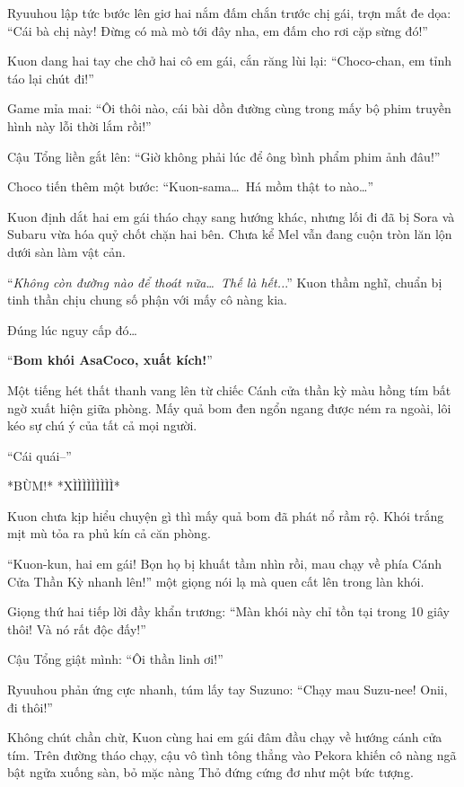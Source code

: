 \documentclass[../main.tex]{subfiles}
\begin{document}
Ryuuhou lập tức bước lên giơ hai nắm đấm chắn trước chị gái, trợn mắt đe dọa: ``Cái bà chị này! Đừng có mà mò tới đây nha, em đấm cho rơi cặp sừng đó!''

Kuon dang hai tay che chở hai cô em gái, cắn răng lùi lại: ``Choco-chan, em tỉnh táo lại chút đi!''

Game mỉa mai: ``Ôi thôi nào, cái bài dồn đường cùng trong mấy bộ phim truyền hình này lỗi thời lắm rồi!''

Cậu Tổng liền gắt lên: ``Giờ không phải lúc để ông bình phẩm phim ảnh đâu!''

Choco tiến thêm một bước: ``Kuon-sama\dots\ Há mồm thật to nào\dots''

Kuon định dắt hai em gái tháo chạy sang hướng khác, nhưng lối đi đã bị Sora và Subaru vừa hóa quỷ chốt chặn hai bên. Chưa kể Mel vẫn đang cuộn tròn lăn lộn dưới sàn làm vật cản.

``\textit{Không còn đường nào để thoát nữa\dots\ Thế là hết..}.'' Kuon thầm nghĩ, chuẩn bị tinh thần chịu chung số phận với mấy cô nàng kia.

Đúng lúc nguy cấp đó\dots

``\textbf{Bom khói AsaCoco, xuất kích!}''

Một tiếng hét thất thanh vang lên từ chiếc Cánh cửa thần kỳ màu hồng tím bất ngờ xuất hiện giữa phòng. Mấy quả bom đen ngổn ngang được ném ra ngoài, lôi kéo sự chú ý của tất cả mọi người.

``Cái quái--''

*BÙM!* *XÌÌÌÌÌÌÌÌÌ*

Kuon chưa kịp hiểu chuyện gì thì mấy quả bom đã phát nổ rầm rộ. Khói trắng mịt mù tỏa ra phủ kín cả căn phòng.

``Kuon-kun, hai em gái! Bọn họ bị khuất tầm nhìn rồi, mau chạy về phía Cánh Cửa Thần Kỳ nhanh lên!'' một giọng nói lạ mà quen cất lên trong làn khói.

Giọng thứ hai tiếp lời đầy khẩn trương: ``Màn khói này chỉ tồn tại trong 10 giây thôi! Và nó rất độc đấy!''

Cậu Tổng giật mình: ``Ôi thần linh ơi!''

Ryuuhou phản ứng cực nhanh, túm lấy tay Suzuno: ``Chạy mau Suzu-nee! Onii, đi thôi!''

Không chút chần chừ, Kuon cùng hai em gái đâm đầu chạy về hướng cánh cửa tím. Trên đường tháo chạy, cậu vô tình tông thẳng vào Pekora khiến cô nàng ngã bật ngửa xuống sàn, bỏ mặc nàng Thỏ đứng cứng đơ như một bức tượng.

\ct
\end{document}
